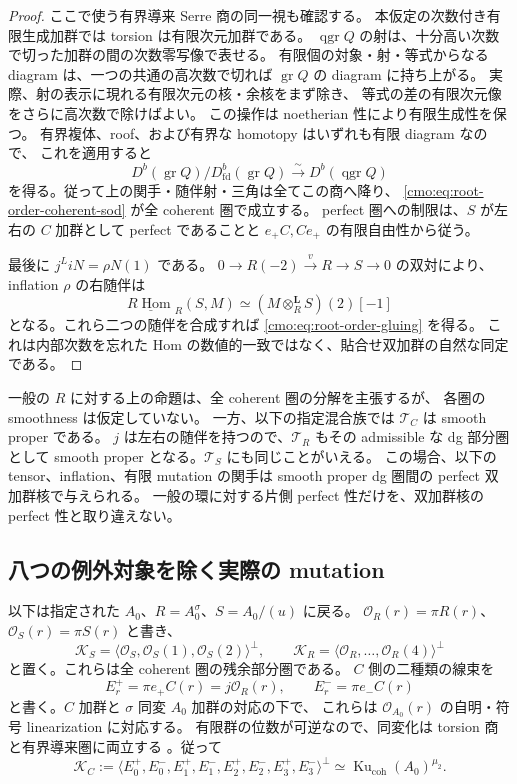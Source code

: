 \begin{proof}
ここで使う有界導来 Serre 商の同一視も確認する。
本仮定の次数付き有限生成加群では torsion は有限次元加群である。
$\operatorname{qgr}Q$ の射は、十分高い次数で切った加群の間の次数零写像で表せる。
有限個の対象・射・等式からなる diagram は、一つの共通の高次数で切れば
$\operatorname{gr}Q$ の diagram に持ち上がる。
実際、射の表示に現れる有限次元の核・余核をまず除き、
等式の差の有限次元像をさらに高次数で除けばよい。
この操作は noetherian 性により有限生成性を保つ。
有界複体、roof、および有界な homotopy はいずれも有限 diagram なので、
これを適用すると
\[
 D^b(\operatorname{gr}Q)/D^b_{\mathrm{fd}}(\operatorname{gr}Q)
 \xrightarrow{\sim}D^b(\operatorname{qgr}Q)
\]
を得る。従って上の関手・随伴射・三角は全てこの商へ降り、
\eqref{cmo:eq:root-order-coherent-sod} が全 coherent 圏で成立する。
perfect 圏への制限は、$S$ が左右の $C$ 加群として perfect であることと
$e_+C,Ce_+$ の有限自由性から従う。

最後に $j^L iN=\rho N(1)$ である。
$0\to R(-2)\xrightarrow{v}R\to S\to0$ の双対により、
inflation $\rho$ の右随伴は
\[
 \underline{R\operatorname{Hom}}_R(S,M)
 \simeq (M\otimes_R^{\mathbf L}S)(2)[-1]
\]
となる。これら二つの随伴を合成すれば
\eqref{cmo:eq:root-order-gluing} を得る。
これは内部次数を忘れた Hom の数値的一致ではなく、貼合せ双加群の自然な同定である。
\end{proof}

\begin{remark}
一般の $R$ に対する上の命題は、全 coherent 圏の分解を主張するが、
各圏の smoothness は仮定していない。
一方、以下の指定混合族では $\mathcal T_C$ は smooth proper である。
$j$ は左右の随伴を持つので、$\mathcal T_R$ もその admissible な dg 部分圏として
smooth proper となる。$\mathcal T_S$ にも同じことがいえる。
この場合、以下の tensor、inflation、有限 mutation の関手は
smooth proper dg 圏間の perfect 双加群核で与えられる。
一般の環に対する片側 perfect 性だけを、双加群核の perfect 性と取り違えない。
\end{remark}



\subsection{八つの例外対象を除く実際の mutation}

以下は指定された $A_0$、$R=A_0^\sigma$、$S=A_0/(u)$ に戻る。
$\mathcal O_R(r)=\pi R(r)$、$\mathcal O_S(r)=\pi S(r)$ と書き、
\[
 \mathcal K_S=\langle\mathcal O_S,\mathcal O_S(1),\mathcal O_S(2)\rangle^\perp,
 \qquad
 \mathcal K_R=\langle\mathcal O_R,\ldots,\mathcal O_R(4)\rangle^\perp
\]
と置く。これらは全 coherent 圏の残余部分圏である。
$C$ 側の二種類の線束を
\[
 E_r^+=\pi e_+C(r)=j\mathcal O_R(r),\qquad
 E_r^-=\pi e_-C(r)
\]
と書く。$C$ 加群と $\sigma$ 同変 $A_0$ 加群の対応の下で、
これらは $\mathcal O_{A_0}(r)$ の自明・符号 linearization に対応する。
有限群の位数が可逆なので、同変化は torsion 商と有界導来圏に両立する
\cite[Section~8]{MEDElagin}。従って
\[
 \mathcal K_C:=
 \langle E_0^+,E_0^-,E_1^+,E_1^-,E_2^+,E_2^-,E_3^+,E_3^-\rangle^\perp
 \simeq\operatorname{Ku}_{\mathrm{coh}}(A_0)^{\mu_2}.
\]

